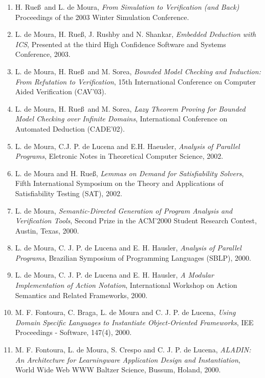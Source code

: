 \documentclass{article}
\begin{document}
\begin{enumerate}
\item H. Rue\ss\ and L. de Moura,
{\em From Simulation to Verification (and Back)}
Proceedings of the 2003 Winter Simulation Conference.

\item L. de Moura, H. Rue\ss, J. Rushby and N. Shankar,
{\em Embedded Deduction with ICS},
Presented at the third High Confidence Software and Systems Conference, 2003.

\item L. de Moura, H. Rue\ss\ and M. Sorea,
{\em Bounded Model Checking and Induction: From Refutation to Verification},
15th International Conference on Computer Aided Verification (CAV'03).

\item L. de Moura, H. Rue\ss\ and M. Sorea,
{\em Lazy Theorem Proving for Bounded Model Checking over Infinite Domains},
International Conference on Automated Deduction (CADE'02).

\item L. de Moura, C.J. P. de Lucena and E.H. Haeusler,
{\em Analysis of Parallel Programs},
Eletronic Notes in Theoretical Computer Science, 2002.

\item L. de Moura and H. Rue\ss,
{\em Lemmas on Demand for Satisfiability Solvers},
Fifth  International Symposium on the Theory and Applications of Satisfiability Testing (SAT), 2002.

\item L. de Moura,
{\em Semantic-Directed Generation of Program Analysis and Verification Tools},
Second Prize in the ACM'2000 Student Research Contest, Austin, Texas, 2000.

\item L. de Moura, C. J. P. de Lucena and E. H. Hausler,
{\em Analysis of Parallel Programs},
Brazilian Symposium of Programming Languages (SBLP), 2000.

\item L. de Moura, C. J. P. de Lucena and E. H. Hausler,
{\em A Modular Implementation of Action Notation},
International Workshop on Action Semantics and Related Frameworks, 2000.

\item M. F. Fontoura, C. Braga, L. de Moura and C. J. P. de Lucena,
{\em Using Domain Specific Languages to Instantiate Object-Oriented Frameworks},
IEE Proceedings - Software, 147(4), 2000.

\item M. F. Fontoura, L. de Moura, S. Crespo and C. J. P. de Lucena,
{\em ALADIN: An Architecture for Learningware Application Design and Instantiation},
World Wide Web WWW Baltzer Science, Bussum, Holand, 2000.


\end{enumerate}
\end{document}
